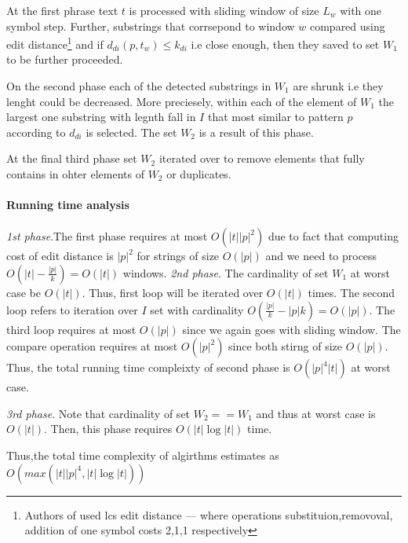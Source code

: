 At the first phrase  text $t$ is processed with sliding window of size $L_{w}$ with one symbol step.
Further, substrings that corrsepond to window $w$ compared using edit distance\footnote{Authors of \cite{} used lcs edit distance --- where  operations substituion,removoval, addition of one symbol costs 2,1,1 respectively} and if $d_{di}(p,t_{w}) \leq k_{di}$ i.e  close enough, then they saved to set $W_{1}$ to be further proceeded. 

On the second phase  each of the detected substrings in $W_{1}$ are shrunk i.e they lenght could be decreased.
More preciesely, within each of the element of $W_{1}$ the largest one substring with legnth fall in $I$ that most similar to pattern $p$ according to $d_{di}$ is selected.
The set $W_{2}$ is a result of this phase.

At the final third phase  set $W_{2}$ iterated over to remove elements that fully contains in ohter elements of $W_{2}$ or duplicates.

\paragraph{Running time analysis}
\emph{1st phase}.The first phase requires at most  $O(|t||p|^2)$ due to fact
that computing cost of edit distance is $|p|^2$ for strings of size $O(|p|)$ and we need to process $O(|t|-\frac{|p|}{k})=O(|t|)$ windows.
\emph{2nd phase}. 
The cardinality of set $W_{1}$  at worst case be $O(|t|)$.
Thus, first loop will be iterated over $O(|t|)$ times.
The second loop refers to iteration over $I$ set with cardinality $O(\frac{|p|}{k}-|p|k) = O(|p|)$.
The third loop requires at most $O(|p|)$ since we again goes with sliding window.
The compare operation requires at most $O(|p|^2)$ since both
stirng of size $O(|p|)$.
Thus, the total running time compleixty of second phase is $O(|p|^4|t|)$ at worst case.

\emph{3rd phase}. 
Note that cardinality of set $W_{2}==W_{1}$ and thus at worst case is $O(|t|)$.
Then, this phase requires $O(|t| \log |t|)$ time. 

Thus,the total time complexity of algirthms estimates as 
$O(max(|t||p|^4,|t| \log|t|))$

